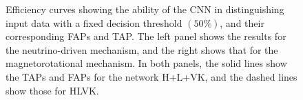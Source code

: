 \documentclass[aps,twocolumn,showpacs,groupedaddress, nofootinbib]{revtex4}  %
\begin{document}
%
%
\begin{figure}
     \begin{center}
        \quad
    \end{center}
    \caption{Efficiency curves showing the ability of the \ac{CNN} in
distinguishing input data with a fixed decision threshold $(50\%)$, 
and their corresponding \acp{FAP} and \ac{TAP}. 
The left panel shows the results for the neutrino-driven mechanism, and
the right shows that for the magnetorotational mechanism. In both panels, the
solid lines show the \acp{TAP} and \acp{FAP} for the network H+L+VK, and the
dashed lines show those for HLVK.\label{fig:ROCfixed}}
\end{figure}
\end{document}
